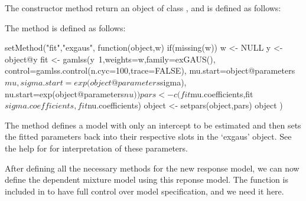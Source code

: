 \documentclass[article]{jss}
\begin{document}
The constructor method return an object of class , and is
defined as follows:
\begin{CodeChunk}
\end{CodeChunk}

The  method is defined as follows: 
\begin{CodeChunk}
\begin{CodeInput}
setMethod("fit","exgaus",
  function(object,w) {
    if(missing(w)) w <- NULL
    y <- object@y
    fit <- gamlss(y~1,weights=w,family=exGAUS(),
      control=gamlss.control(n.cyc=100,trace=FALSE),
      mu.start=object@parameters$mu,
      sigma.start=exp(object@parameters$sigma),
      nu.start=exp(object@parameters$nu))
    pars <- c(fit$mu.coefficients,fit$sigma.coefficients,fit$nu.coefficients)
    object <- setpars(object,pars)
    object
  }
)
\end{CodeInput}
\end{CodeChunk}

The  method defines a  model with 
only an intercept to be estimated and then sets the fitted parameters 
back into their respective slots in the `exgaus' object. See the help 
for  for interpretation of these parameters. 

After defining all the necessary methods for the new response model, 
we can  now define the dependent mixture model using this reponse model. 
The function  is included in  to have 
full control over model specification, and we need it here. 
\end{document}
